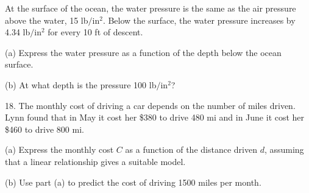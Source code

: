 \documentclass{sebase}
\begin{document}
\begin{multicols}{2}
\begin{ExerciseList}
\item[{\hfill \protect\fbox{\hspace{-2pt}17.\hspace{-2pt}}}] At the surface
of the ocean, the water pressure is the same as the air pressure above the
water, 15 lb$/$in$^{2}$. Below the surface, the water pressure increases by
4.34 lb$/$in$^{2}$ for every 10 ft of descent.\vspace{-2pt}

\begin{ExerciseList}
\item[(a)] Express the water pressure as a function of the depth below the
ocean surface.

%

\item[(b)] At what depth is the pressure 100 lb$/$in$^{2}$?

%
\end{ExerciseList}

%

\item[18.] The monthly cost of driving a car depends on the number of miles
driven. Lynn found that in May it cost her \$380 to drive 480 mi and in June
it cost her \$460 to drive 800 mi.\vspace{-2pt}

\begin{ExerciseList}
\item[(a)] Express the monthly cost $C$ as a function of the distance driven 
$d$, assuming that a linear relationship gives a suitable model.

%

\item[(b)] Use part (a) to predict the cost of driving 1500 miles per month.


\end{ExerciseList}
\end{ExerciseList}
\end{multicols}
\end{document}

